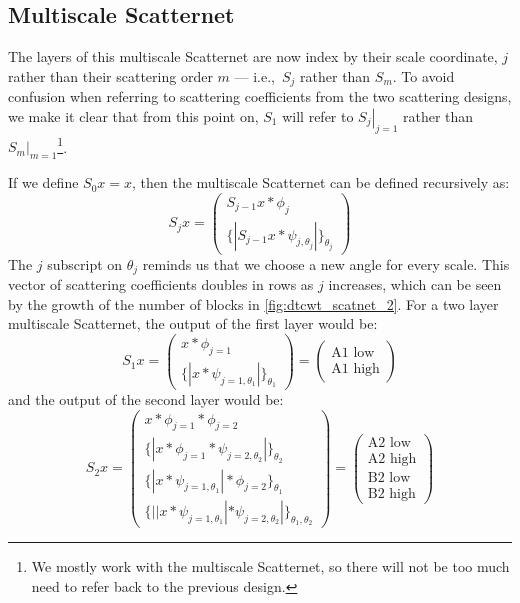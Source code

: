 \subsection{Multiscale Scatternet}
  The layers of this multiscale Scatternet are now index by their scale
  coordinate, $j$ rather than their scattering order $m$ --- i.e.,\ $S_j$ rather
  than $S_m$.  To avoid confusion when referring to scattering coefficients
  from the two scattering designs, we make it clear that from this point on,
  $S_1$ will refer to $\left. S_j \right|_{j=1}$ rather than $\left. S_m
  \right|_{m=1}$\footnote{We mostly work with the multiscale Scatternet, so
  there will not be too much need to refer back to the previous design.}.

  If we define $S_0x = x$, then the multiscale Scatternet can be defined
  recursively as:
  \begin{equation}
    S_jx = \left(\begin{array}{c}
      S_{j-1}x \ast \phi_j \\
      \{|S_{j-1}x \ast \psi_{j, \theta_j}| \}_{\theta_j}
    \end{array} \right)
  \end{equation}
  The $j$ subscript on $\theta_j$ reminds us that we choose a new angle for
  every scale.
  This vector of scattering coefficients doubles in rows as $j$ increases,
  which can be seen by the growth of the number of blocks in
  \autoref{fig:dtcwt_scatnet_2}. For a two layer multiscale Scatternet, the
  output of the first layer would be:
  \begin{equation}
    S_1x = \left( \begin{array}{c}
      x \ast \phi_{j=1} \\
      \{|x \ast \psi_{j=1, \theta_1}| \}_{\theta_1}
    \end{array} \right)
    = \left( \begin{array}{c}
      \mbox{A1 low} \\
      \mbox{A1 high}
    \end{array} \right)
    \label{eq:mutliscale_layer1_out}
  \end{equation}
  and the output of the second layer would be:
  \begin{equation}
    S_2x = \left( \begin{array}{c}
      x \ast \phi_{j=1} \ast \phi_{j=2} \\
      \{|x \ast \phi_{j=1} \ast \psi_{j=2,\theta_2}|\}_{\theta_2} \\
      \{|x \ast \psi_{j=1, \theta_1}| \ast \phi_{j=2} \}_{\theta_1} \\
      \{||x \ast \psi_{j=1,\theta_1} | \ast \psi_{j=2, \theta_2}
      | \}_{\theta_1, \theta_2} 
    \end{array} \right)
    = \left( \begin{array}{c}
      \mbox{A2 low} \\
      \mbox{A2 high} \\
      \mbox{B2 low} \\
      \mbox{B2 high}
    \end{array} \right)
    \label{eq:multiscale_layer2_out}
  \end{equation}


